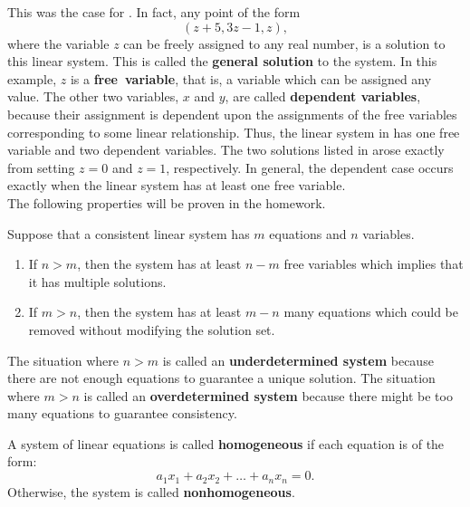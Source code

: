 This was the case for . In fact, any point of the form 
\setcounter{equation}{\value{Thm}} \begin{equation}\label{exam:generalform} (z+5, 3z-1,z), \end{equation} 
 where the variable $z$ can be freely assigned to any real number, is a solution to this linear system. This is called the \textbf{general solution} to the system. In this example, $z$ is a \mbox{\label{def:freevar}\textbf{free variable},} that is, a variable which can be assigned any value. The other two variables, $x$ and $y$, are called \textbf{dependent variables}, because their assignment is dependent upon the assignments of the free variables corresponding to some linear relationship. Thus, the linear system in  has one free variable and two dependent variables. The two solutions listed in  arose exactly from setting $z=0$ and $z=1$, respectively. In general, the dependent case occurs exactly when the linear system has at least one free variable. \\

The following properties will be proven in the homework.\\

\begin{Prop} \label{prop:1.1determine} Suppose that a consistent linear system has $m$ equations and $n$ variables. 
\begin{enumerate}[label=(\roman*), series=!THM!]
\item  If $n > m$, then the system has at least $n-m$ free variables which implies that it has multiple solutions.\\
\item If $m > n$, then the system has at least $m-n$ many equations which could be removed without modifying the solution set.
\end{enumerate}
\end{Prop}\vs

The situation where $n >m$ is called an \textbf{underdetermined system} because there are not enough equations to guarantee a unique solution. The situation where $m >n$ is called an \textbf{overdetermined system} because there might be too many equations to guarantee consistency. 

\begin{Def}\label{def:homogeneous} A system of linear equations is called \textbf{homogeneous} if each equation is of the form:
\[a_1x_1+a_2x_2+\ldots+a_nx_n = 0.\] Otherwise, the system is called \textbf{nonhomogeneous}.\\
\end{Def}


